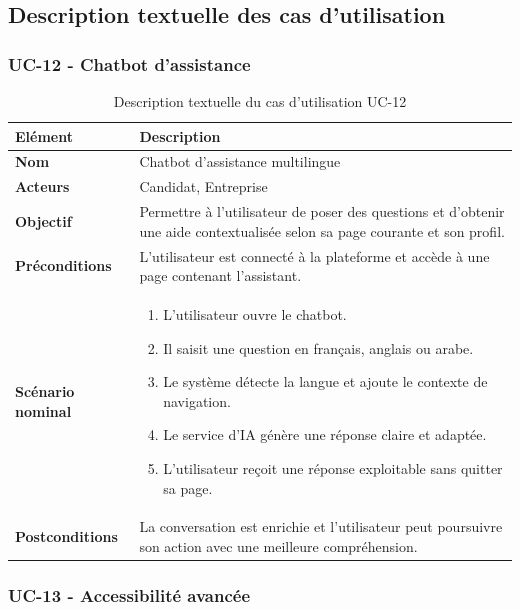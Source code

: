 \documentclass[12pt,a4paper]{report}
\newcommand{\tblhead}[1]{\cellcolor{darkblue}\color{white}\bfseries #1}
\newcommand{\tblleft}[1]{\bfseries\color{darkblue} #1}
\begin{document}
\subsection{Description textuelle des cas d'utilisation}

\subsubsection{UC-12 - Chatbot d'assistance}

\renewcommand{\arraystretch}{1.25}
\begin{table}[H]
\centering
\begin{tabularx}{\textwidth}{|L{3.2cm}|Y|}
\hline
\tblhead{Elément} & \tblhead{Description} \\
\hline
\tblleft{Nom} & Chatbot d'assistance multilingue \\
\hline
\tblleft{Acteurs} & Candidat, Entreprise \\
\hline
\tblleft{Objectif} & Permettre à l'utilisateur de poser des questions et d'obtenir une aide contextualisée selon sa page courante et son profil. \\
\hline
\tblleft{Préconditions} & L'utilisateur est connecté à la plateforme et accède à une page contenant l'assistant. \\
\hline
\tblleft{Scénario nominal} &
\begin{enumerate}
  \item L'utilisateur ouvre le chatbot.
  \item Il saisit une question en français, anglais ou arabe.
  \item Le système détecte la langue et ajoute le contexte de navigation.
  \item Le service d'IA génère une réponse claire et adaptée.
  \item L'utilisateur reçoit une réponse exploitable sans quitter sa page.
\end{enumerate} \\
\hline
\tblleft{Postconditions} & La conversation est enrichie et l'utilisateur peut poursuivre son action avec une meilleure compréhension. \\
\hline
\end{tabularx}
\caption{Description textuelle du cas d'utilisation UC-12}
\label{tab:uc12-chatbot}
\end{table}
\renewcommand{\arraystretch}{1}

\subsubsection{UC-13 - Accessibilité avancée}
\end{document}
